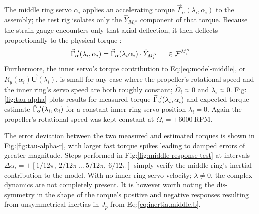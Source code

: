\par
The middle ring servo $\alpha_i$ applies an accelerating torque $\vec{\Gamma}_\alpha(\lambda_i,\alpha_i)$ to the assembly; the test rig isolates only the $\hat{Y}_{M_i''}$ component of that torque. Because the strain gauge encounters only that axial deflection, it then deflects proportionally to the physical torque :
\begin{equation}
\vec{\Gamma}_\alpha\text{}\hspace{-2pt}'(\lambda_i,\alpha_i)=\vec{\Gamma}_\alpha(\lambda_i\alpha_i)\cdot\hat{Y}_{M_i''}~~~~\in\mathcal{F}^{M_i''}
\end{equation}
Furthermore, the inner servo's torque contribution to Eq:\ref{eq:model-middle}, or $R_y(\alpha_i)\vec{\mathbf{U}}(\lambda_i)$, is small for any case where the propeller's rotational speed and the inner ring's servo speed are both roughly constant; $\dot{\Omega}_i\approx 0$ and $\dot{\lambda}_i\approx 0$. Fig:\ref{fig:tau-alpha} plots results for measured torque $\vec{\Gamma}_\alpha\text{}\hspace{-2pt}'(\lambda_i,\alpha_i)$ and expected torque estimate $\hat{\Gamma}_\alpha\text{}\hspace{-2pt}'(\lambda_i,\alpha_i)$ for a constant inner ring servo position $\lambda_i=0$. Again the propeller's rotational speed was kept constant at $\Omega_i=+6000~\text{RPM}$. 
\par
The error deviation between the two measured and estimated torques is shown in Fig:\ref{fig:tau-alpha-r}, with larger fast torque spikes leading to damped errors of greater magnitude. Steps performed in Fig:\ref{fig:middle-response-test} at intervals $\Delta\alpha_i=\pm[1/12\pi,~2/12\pi~\ldots~5/12\pi,~6/12\pi]$ simply verify the middle ring's inertial contribution to the model. With no inner ring servo velocity; $\dot\lambda\not=0$, the complex dynamics are not completely present. It is however worth noting the dis-symmetry in the shape of the torque's positive and negative responses resulting from unsymmetrical inertias in $J_p$ from Eq:\ref{eq:inertia.middle.b}.
